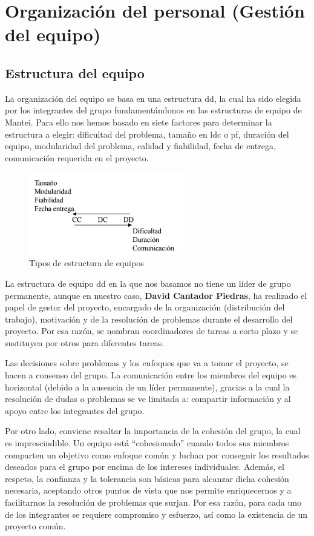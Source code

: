 \section{Organización del personal (Gestión del equipo)}
\subsection{Estructura del equipo}
La organización del equipo se basa en una estructura \gls{dd}, la cual ha sido elegida por los integrantes del grupo fundamentándonos en las estructuras de equipo de Mantei.
Para ello nos hemos basado en siete factores para determinar la estructura a elegir: dificultad del problema, tamaño en \gls{ldc} o \gls{pf}, duración del equipo, modularidad del problema, calidad y fiabilidad, fecha de entrega, comunicación requerida en el proyecto.

\begin{figure}[H]
	\centering
	\includegraphics[width=0.6\textwidth]{images/dd.PNG}
	\caption{Tipos de estructura de equipos}
\end{figure}

La estructura de equipo \gls{dd} en la que nos basamos no tiene un líder de grupo permanente, aunque en nuestro caso, \textbf{David Cantador Piedras}, ha realizado el papel de gestor del proyecto, encargado de la organización (distribución del trabajo), motivación y de la resolución de problemas durante el desarrollo del proyecto. Por esa razón, se nombran coordinadores de tareas a corto plazo y se sustituyen por otros para diferentes tareas.

Las decisiones sobre problemas y los enfoques que va a tomar el proyecto, se hacen a consenso del grupo. La comunicación entre los miembros del equipo es horizontal (debido a la ausencia de un líder permanente), gracias a la cual la resolución de dudas o problemas se ve limitada a: compartir información y al apoyo entre los integrantes del grupo.

Por otro lado, conviene resaltar la importancia de la cohesión del grupo, la cual es imprescindible. Un equipo está ``cohesionado'' cuando todos sus miembros comparten un objetivo como enfoque común y luchan por conseguir los resultados deseados para el grupo por encima de los intereses individuales. Además, el respeto, la confianza y la tolerancia son básicas para alcanzar dicha cohesión necesaria, aceptando otros puntos de vista que nos permite enriquecernos y a facilitarnos la resolución de problemas que surjan. Por esa razón, para cada uno de los integrantes se requiere compromiso y esfuerzo, así como la existencia de un proyecto común.

